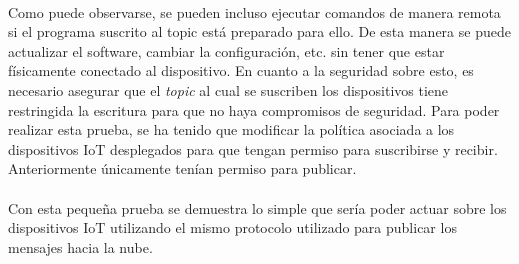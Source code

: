 \documentclass[../../memoria.tex]{subfiles}
\begin{document}
\paragraph{}
Como puede observarse, se pueden incluso ejecutar comandos de manera remota si el programa suscrito al topic está preparado para ello. De esta manera se puede actualizar el software, cambiar la configuración, etc. sin tener que estar físicamente conectado al dispositivo. En cuanto a la seguridad sobre esto, es necesario asegurar que el \textit{topic} al cual se suscriben los dispositivos tiene restringida la escritura para que no haya compromisos de seguridad. Para poder realizar esta prueba, se ha tenido que modificar la política asociada a los dispositivos IoT desplegados para que tengan permiso para suscribirse y recibir. Anteriormente únicamente tenían permiso para publicar.

\paragraph{}
Con esta pequeña prueba se demuestra lo simple que sería poder actuar sobre los dispositivos IoT utilizando el mismo protocolo utilizado para publicar los mensajes hacia la nube.
\end{document}
